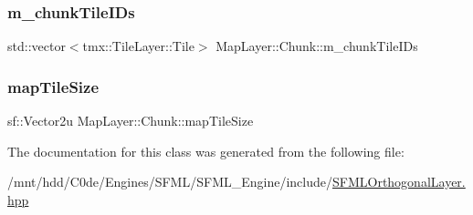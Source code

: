 \subsubsection{\texorpdfstring{m\+\_\+chunk\+Tile\+I\+Ds}{m\_chunkTileIDs}}
{\footnotesize\ttfamily std\+::vector$<$tmx\+::\+Tile\+Layer\+::\+Tile$>$ Map\+Layer\+::\+Chunk\+::m\+\_\+chunk\+Tile\+I\+Ds\hspace{0.3cm}{\ttfamily [private]}}

\mbox{\label{classMapLayer_1_1Chunk_a010215bc42e515278da75b680c88dcdf}} 
\subsubsection{\texorpdfstring{map\+Tile\+Size}{mapTileSize}}
{\footnotesize\ttfamily sf\+::\+Vector2u Map\+Layer\+::\+Chunk\+::map\+Tile\+Size\hspace{0.3cm}{\ttfamily [private]}}



The documentation for this class was generated from the following file\+:\begin{DoxyCompactItemize}
\item 
/mnt/hdd/\+C0de/\+Engines/\+S\+F\+M\+L/\+S\+F\+M\+L\+\_\+\+Engine/include/\hyperlink{SFMLOrthogonalLayer_8hpp}{S\+F\+M\+L\+Orthogonal\+Layer.\+hpp}\end{DoxyCompactItemize}
